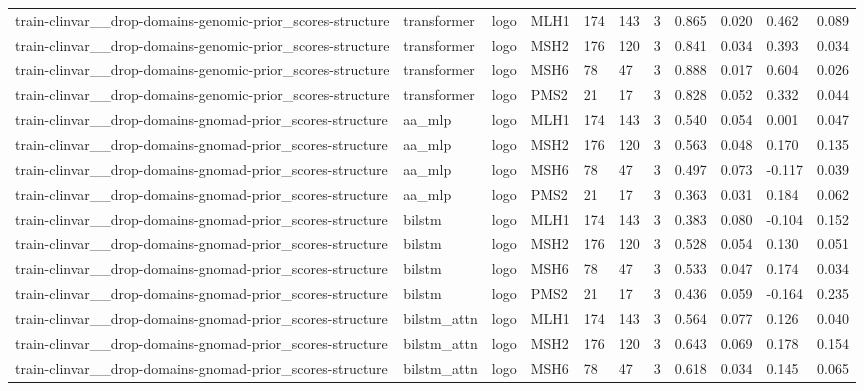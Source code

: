 \begin{table}[t]
\begin{tabular}{lllllllllll}
train-clinvar\_\_drop-domains-genomic-prior\_scores-structure & transformer & logo & MLH1 & 174 & 143 & 3 & 0.865 & 0.020 & 0.462 & 0.089 \\
train-clinvar\_\_drop-domains-genomic-prior\_scores-structure & transformer & logo & MSH2 & 176 & 120 & 3 & 0.841 & 0.034 & 0.393 & 0.034 \\
train-clinvar\_\_drop-domains-genomic-prior\_scores-structure & transformer & logo & MSH6 & 78 & 47 & 3 & 0.888 & 0.017 & 0.604 & 0.026 \\
train-clinvar\_\_drop-domains-genomic-prior\_scores-structure & transformer & logo & PMS2 & 21 & 17 & 3 & 0.828 & 0.052 & 0.332 & 0.044 \\
train-clinvar\_\_drop-domains-gnomad-prior\_scores-structure & aa\_mlp & logo & MLH1 & 174 & 143 & 3 & 0.540 & 0.054 & 0.001 & 0.047 \\
train-clinvar\_\_drop-domains-gnomad-prior\_scores-structure & aa\_mlp & logo & MSH2 & 176 & 120 & 3 & 0.563 & 0.048 & 0.170 & 0.135 \\
train-clinvar\_\_drop-domains-gnomad-prior\_scores-structure & aa\_mlp & logo & MSH6 & 78 & 47 & 3 & 0.497 & 0.073 & -0.117 & 0.039 \\
train-clinvar\_\_drop-domains-gnomad-prior\_scores-structure & aa\_mlp & logo & PMS2 & 21 & 17 & 3 & 0.363 & 0.031 & 0.184 & 0.062 \\
train-clinvar\_\_drop-domains-gnomad-prior\_scores-structure & bilstm & logo & MLH1 & 174 & 143 & 3 & 0.383 & 0.080 & -0.104 & 0.152 \\
train-clinvar\_\_drop-domains-gnomad-prior\_scores-structure & bilstm & logo & MSH2 & 176 & 120 & 3 & 0.528 & 0.054 & 0.130 & 0.051 \\
train-clinvar\_\_drop-domains-gnomad-prior\_scores-structure & bilstm & logo & MSH6 & 78 & 47 & 3 & 0.533 & 0.047 & 0.174 & 0.034 \\
train-clinvar\_\_drop-domains-gnomad-prior\_scores-structure & bilstm & logo & PMS2 & 21 & 17 & 3 & 0.436 & 0.059 & -0.164 & 0.235 \\
train-clinvar\_\_drop-domains-gnomad-prior\_scores-structure & bilstm\_attn & logo & MLH1 & 174 & 143 & 3 & 0.564 & 0.077 & 0.126 & 0.040 \\
train-clinvar\_\_drop-domains-gnomad-prior\_scores-structure & bilstm\_attn & logo & MSH2 & 176 & 120 & 3 & 0.643 & 0.069 & 0.178 & 0.154 \\
train-clinvar\_\_drop-domains-gnomad-prior\_scores-structure & bilstm\_attn & logo & MSH6 & 78 & 47 & 3 & 0.618 & 0.034 & 0.145 & 0.065 \\

\end{tabular}
\end{table}
